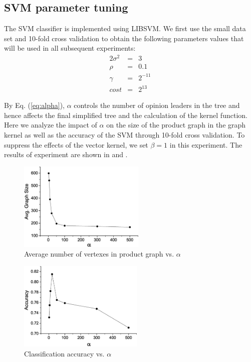 \subsection{SVM parameter tuning}
\label{sec:imk}
The SVM classifier is implemented using LIBSVM\cite{LibSVM}.
We first use the small data set and 10-fold cross validation to
obtain the following parameters values that will be used in
all subsequent experiments:
\begin{eqnarray*}
2\sigma^2 &=& 3 \\
\rho &=& 0.1 \\
\gamma &=& 2^{-11} \\
cost &=& 2^{13}
\end{eqnarray*}

By Eq. (\ref{eq:alpha}), $\alpha$ controls the number of opinion leaders
in the tree and hence affects the final simplified tree and the
calculation of the kernel function.
Here we analyze the impact of $\alpha$ on the size of the product graph
in the graph kernel as well as the accuracy of the
SVM through 10-fold cross validation.
To suppress the effects of the vector kernel, we set $\beta=1$ in this
experiment.
The results of experiment are shown in  and
.
\begin{figure}[htb]
\centering
\includegraphics[height=120pt]{impact_alpha_size.eps}
\caption{Average number of vertexes in product graph vs. $\alpha$}
\label{fig:result-alpha-size}
\end{figure}
\begin{figure}[htb]
\centering
\includegraphics[height=120pt]{impact_alpha_accuracy.eps}
\caption{Classification accuracy vs. $\alpha$}
\label{fig:result-alpha-accuracy}
\end{figure}

